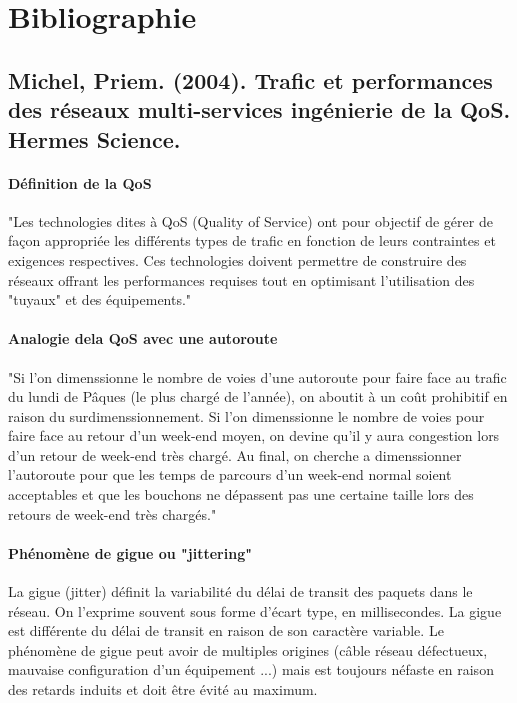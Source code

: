 \documentclass[french]{article}
\begin{document}

\newpage

\section{Bibliographie}

\subsection*{Michel, Priem. (2004). Trafic et performances des réseaux multi-services ingénierie de la QoS. Hermes Science.}

\paragraph{Définition de la QoS}

"Les technologies dites à QoS (Quality of Service) ont pour objectif de gérer de façon appropriée les différents types de trafic en fonction de leurs contraintes et exigences respectives.
Ces technologies doivent permettre de construire des réseaux offrant les performances requises tout en optimisant l'utilisation des "tuyaux" et des équipements."

\paragraph{Analogie dela QoS avec une autoroute}

"Si l'on dimenssionne le nombre de voies d'une autoroute pour faire face au trafic du lundi de Pâques (le plus chargé de l'année), on aboutit à un coût prohibitif en raison du surdimenssionnement.
Si l'on dimenssionne le nombre de voies pour faire face au retour d'un week-end moyen, on devine qu'il y aura congestion lors d'un retour de week-end très chargé.
Au final, on cherche a dimenssionner l'autoroute pour que les temps de parcours d'un week-end normal soient acceptables et que les bouchons ne dépassent pas une certaine taille lors des retours de week-end très chargés."

\paragraph{Phénomène de gigue ou "jittering"}

La gigue (jitter) définit la variabilité du délai de transit des paquets dans le réseau. On l'exprime souvent sous forme d'écart type, en millisecondes.
La gigue est différente du délai de transit en raison de son caractère variable. Le phénomène de gigue peut avoir de multiples origines (câble réseau défectueux, mauvaise configuration d'un équipement ...) mais est toujours néfaste en raison des retards induits et doit être évité au maximum.
\end{document}
